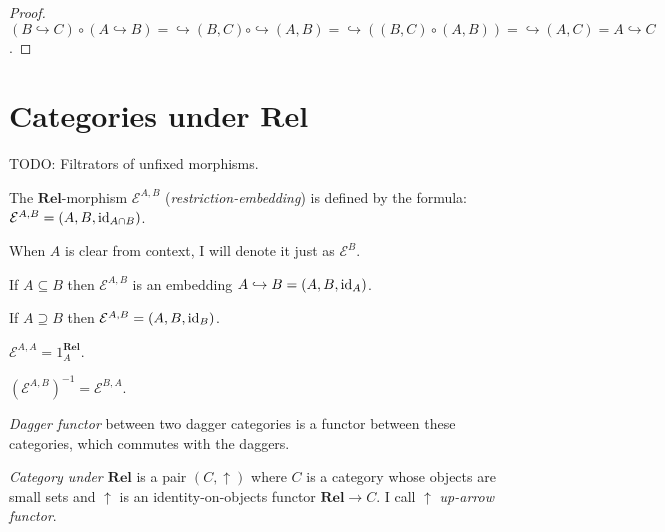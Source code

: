 \begin{proof}
  $(B \hookrightarrow C) \circ (A \hookrightarrow B) = \hookrightarrow (B , C)
  \circ \hookrightarrow (A , B) = \hookrightarrow ((B , C) \circ (A , B)) =
  \hookrightarrow (A , C) = A \hookrightarrow C$.
\end{proof}

\section{\texorpdfstring{Categories under $\mathbf{Rel}$}{Categories under Rel}}

TODO: Filtrators of unfixed morphisms.

\begin{defn}
  The $\mathbf{Rel}$-morphism $\mathcal{E}^{A,B}$
  (\emph{restriction-embedding}) is defined by the formula: $\mathcal{E}^{A,B}
  = (A , B , \operatorname{id}_{A \cap B})$.
  
  When $A$ is clear from context, I will denote it just as $\mathcal{E}^B$.
\end{defn}

\begin{obvious}
If $A \subseteq B$ then $\mathcal{E}^{A,B}$ is an embedding $A \hookrightarrow B
= (A , B , \operatorname{id}_A)$.
\end{obvious}

\begin{obvious}
If $A \supseteq B$ then $\mathcal{E}^{A,B} = (A , B ,
\operatorname{id}_B)$.
\end{obvious}

\begin{obvious}
$\mathcal{E}^{A,A} = 1^{\mathbf{Rel}}_A$.
\end{obvious}

\begin{obvious}
$(\mathcal{E}^{A,B})^{- 1} = \mathcal{E}^{B,A}$.
\end{obvious}

\begin{defn}
\emph{Dagger functor} between two dagger categories is a functor between
these categories, which commutes with the daggers.
\end{defn}

\begin{defn}
\emph{Category under $\mathbf{Rel}$} is a pair $(C , \uparrow)$
where $C$ is a category whose objects are small sets and $\uparrow$ is an
identity-on-objects functor $\mathbf{Rel} \rightarrow C$. I call
$\uparrow$ \emph{up-arrow functor}.
\end{defn}


